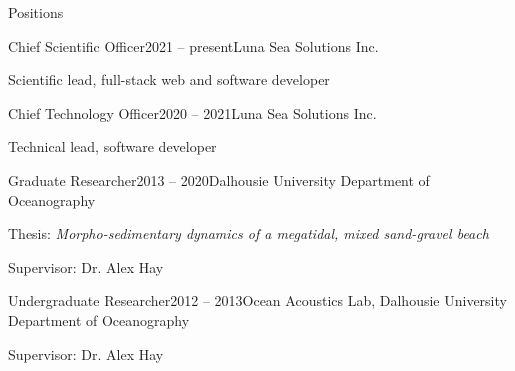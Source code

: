 \documentclass{resume} %
\begin{document}
\begin{rSection}{Positions}

	\begin{rSubsection}{Chief Scientific Officer}{2021 -- present}{Luna Sea Solutions Inc.}{}
		\item Scientific lead, full-stack web and software developer
	\end{rSubsection}

	\begin{rSubsection}{Chief Technology Officer}{2020 -- 2021}{Luna Sea Solutions Inc.}{}
		\item Technical lead, software developer
	\end{rSubsection}

	\begin{rSubsection}{Graduate Researcher}{2013 -- 2020}{Dalhousie University Department of Oceanography}{}
		\item Thesis: \textit{Morpho-sedimentary dynamics of a megatidal, mixed sand-gravel beach}
		\item Supervisor: Dr. Alex Hay
	\end{rSubsection}

	\begin{rSubsection}{Undergraduate Researcher}{2012 -- 2013}{Ocean Acoustics Lab, Dalhousie University Department of Oceanography}{}
		\item Supervisor: Dr. Alex Hay
	\end{rSubsection}

\end{rSection}
\end{document}
